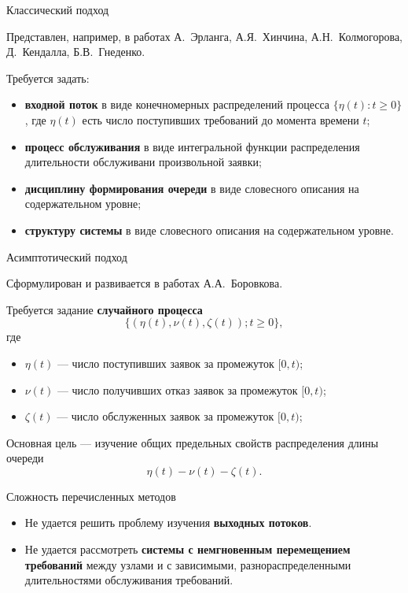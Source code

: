 \documentclass[10pt]{beamer}
\newcommand{\backupend}{
   \addtocounter{framenumberappendix}{-\value{framenumber}}
   \addtocounter{framenumber}{\value{framenumberappendix}} 
}
\begin{document}
\begin{frame}{Классический подход}
\begin{block}{}
Представлен, например, в работах А.~Эрланга, А.Я.~Хинчина, А.Н.~Колмогорова, Д.~Кендалла, Б.В.~Гнеденко.
\end{block}

  Требуется задать:
  \begin{itemize}
  \item \textbf{входной поток} в виде конечномерных распределений процесса $\{\eta(t) \colon t \geqslant 0\}$, где $\eta(t)$ есть число поступивших требований до момента времени $t$;
  \item \textbf{процесс обслуживания} в виде интегральной функции
    распределения длительности обслуживани произвольной заявки;
  \item \textbf{дисциплину формирования очереди} в виде словесного описания на
    содержательном уровне;
  \item \textbf{структуру системы} в виде словесного описания на
    содержательном уровне.
  \end{itemize}
\end{frame}


\begin{frame}{Асимптотический подход}
\begin{block}{}
Сформулирован и развивается в работах А.А.~Боровкова.
\end{block}

  Требуется задание \textbf{случайного процесса} \[\{(\eta(t),
  \nu(t), \zeta(t));t\geqslant0\}, \] где 
  \begin{itemize}
  \item $\eta(t)$ --- число поступивших заявок за промежуток $[0,t)$;
  \item $\nu(t)$ --- число получивших отказ заявок за промежуток $[0,t)$;
  \item $\zeta(t)$ --- число обслуженных заявок за промежуток $[0,t)$;
  \end{itemize}
  Основная цель --- изучение общих предельных свойств распределения
  длины очереди \[\eta(t)-\nu(t)-\zeta(t). \]
\end{frame}

\begin{frame}{Сложность перечисленных методов}
  \begin{itemize}
  \item Не удается решить проблему изучения \textbf{выходных потоков}.
    \bigskip
  \item Не удается рассмотреть \textbf{системы с немгновенным перемещением требований} между узлами и с зависимыми, разнораспределенными длительностями обслуживания требований.
  \end{itemize}
\end{frame}
\backupend
\end{document}
